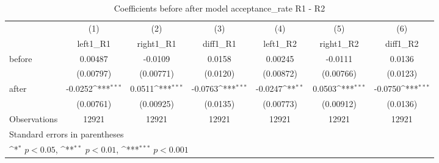 \begin{table}[htbp]\centering
\def\sym#1{\ifmmode^{#1}\else\(^{#1}\)\fi}
\caption{Coefficients before after model acceptance\_rate R1 - R2}
\begin{tabular}{l*{6}{c}}
\hline\hline
                    &\multicolumn{1}{c}{(1)}&\multicolumn{1}{c}{(2)}&\multicolumn{1}{c}{(3)}&\multicolumn{1}{c}{(4)}&\multicolumn{1}{c}{(5)}&\multicolumn{1}{c}{(6)}\\
                    &\multicolumn{1}{c}{left1\_R1}&\multicolumn{1}{c}{right1\_R1}&\multicolumn{1}{c}{diff1\_R1}&\multicolumn{1}{c}{left1\_R2}&\multicolumn{1}{c}{right1\_R2}&\multicolumn{1}{c}{diff1\_R2}\\
\hline
before              &     0.00487         &     -0.0109         &      0.0158         &     0.00245         &     -0.0111         &      0.0136         \\
                    &   (0.00797)         &   (0.00771)         &    (0.0120)         &   (0.00872)         &   (0.00766)         &    (0.0123)         \\
[1em]
after               &     -0.0252\sym{***}&      0.0511\sym{***}&     -0.0763\sym{***}&     -0.0247\sym{**} &      0.0503\sym{***}&     -0.0750\sym{***}\\
                    &   (0.00761)         &   (0.00925)         &    (0.0135)         &   (0.00773)         &   (0.00912)         &    (0.0136)         \\
\hline
Observations        &       12921         &       12921         &       12921         &       12921         &       12921         &       12921         \\
\hline\hline
\multicolumn{7}{l}{\footnotesize Standard errors in parentheses}\\
\multicolumn{7}{l}{\footnotesize \sym{*} \(p<0.05\), \sym{**} \(p<0.01\), \sym{***} \(p<0.001\)}\\
\end{tabular}
\end{table}
